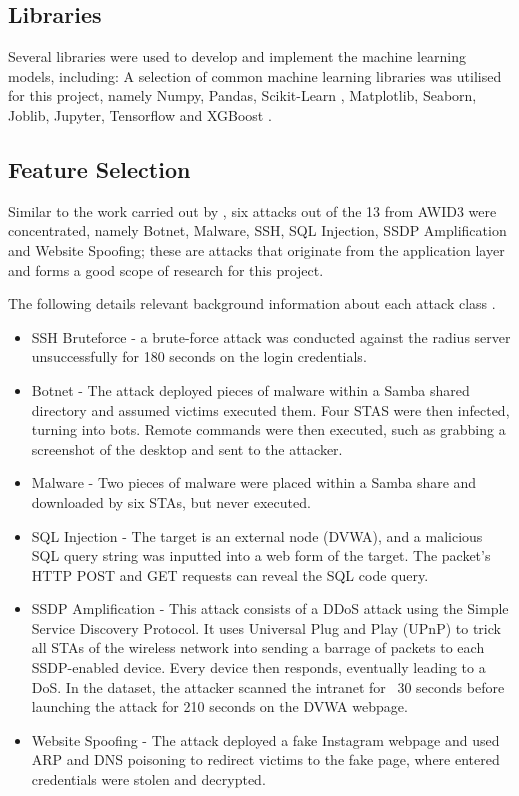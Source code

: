 \subsection{Libraries}

Several libraries were used to develop and implement the machine learning models, including: 
A selection of common machine learning libraries was utilised for this project, namely Numpy, Pandas, Scikit-Learn \parencite{scikit-learn}, Matplotlib, Seaborn, Joblib, Jupyter, Tensorflow \parencite{tensorflow2015-whitepaper} and XGBoost \parencite{XGBoost}. 

\subsection{Feature Selection}

Similar to the work carried out by \textcite{s22155633}, six attacks out of the 13 from AWID3 were concentrated, namely Botnet, Malware, SSH, SQL Injection, SSDP Amplification and Website Spoofing; these are attacks that originate from the application layer and forms a good scope of research for this project. 

The following details relevant background information about each attack class \parencite{kolias2015intrusion}.
\begin{itemize}
	\item SSH Bruteforce - a brute-force attack was conducted against the radius server unsuccessfully for 180 seconds on the login credentials. 
	\item Botnet - The attack deployed pieces of malware within a Samba shared directory and assumed victims executed them. Four STAS were then infected, turning into bots. Remote commands were then executed, such as grabbing a screenshot of the desktop and sent to the attacker.
	\item Malware - Two pieces of malware were placed within a Samba share and downloaded by six STAs, but never executed. 
	\item SQL Injection - The target is an external node (DVWA), and a malicious SQL query string was inputted into a web form of the target. The packet's HTTP POST and GET requests can reveal the SQL code query.
	\item SSDP Amplification - This attack consists of a DDoS attack using the Simple Service Discovery Protocol. It uses Universal Plug and Play (UPnP) to trick all STAs of the wireless network into sending a barrage of packets to each SSDP-enabled device. Every device then responds, eventually leading to a DoS. In the dataset, the attacker scanned the intranet for ~30 seconds before launching the attack for 210 seconds on the DVWA webpage.
	\item Website Spoofing - The attack deployed a fake Instagram webpage and used ARP and DNS poisoning to redirect victims to the fake page, where entered credentials were stolen and decrypted. 
\end{itemize}

